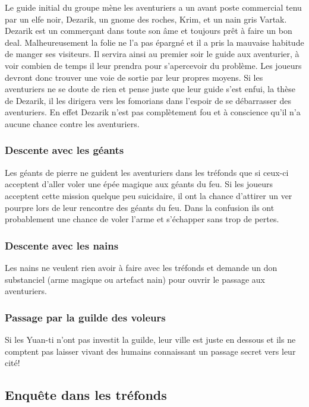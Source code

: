 Le guide initial du groupe mène les aventuriers a un avant poste commercial tenu par un elfe noir, Dezarik, un gnome des roches, Krim, et un nain gris Vartak. Dezarik est un commerçant dans toute son âme et toujours prêt à faire un bon deal. Malheureusement la folie ne l'a pas épargné et il a pris la mauvaise habitude de manger ses visiteurs. Il servira ainsi au premier soir le guide aux aventurier, à voir combien de temps il leur prendra pour s'apercevoir du problème. Les joueurs devront donc trouver une voie de sortie par leur propres moyens. Si les aventuriers ne se doute de rien et pense juste que leur guide s'est enfui, la thèse de Dezarik, il les dirigera vers les fomorians dans l'espoir de se débarrasser des aventuriers. En effet Dezarik n'est pas complètement fou et à conscience qu'il n'a aucune chance contre les aventuriers. 

\subsubsection{Descente avec les géants}

Les géants de pierre ne guident les aventuriers dans les tréfonds que si ceux-ci
acceptent d'aller voler une épée magique aux géants du feu. Si les joueurs acceptent
cette mission quelque peu suicidaire, il ont la chance d'attirer un ver pourpre lors 
de leur rencontre des géants du feu. Dans la confusion ils ont probablement une chance 
de voler l'arme et s'échapper sans trop de pertes.

\subsubsection{Descente avec les nains}

Les nains ne veulent rien avoir à faire avec les tréfonds et demande un don
substanciel (arme magique ou artefact nain) pour ouvrir le passage aux 
aventuriers.


\subsubsection{Passage par la guilde des voleurs}

Si les Yuan-ti n'ont pas investit la guilde, leur ville est juste en dessous et 
ils ne comptent pas laisser vivant des humains connaissant un passage secret 
vers leur cité!


\subsection*{Enquête dans les tréfonds}

